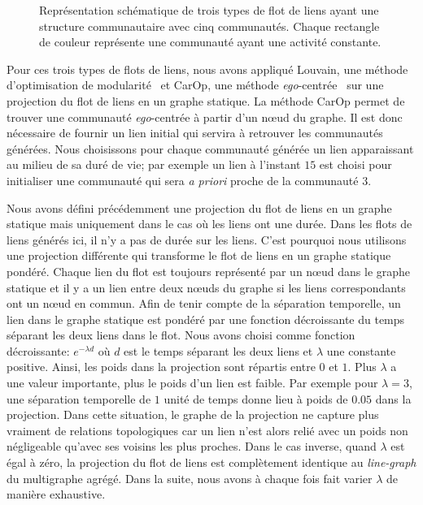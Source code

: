\begin{figure}
\begin{subfigure}{0.3\textwidth}
		\caption{}
		\label{fig:versqualite_gen_test3}
	\end{subfigure}
	\caption{Représentation schématique de trois types de flot de liens ayant une structure communautaire avec cinq communautés.
	Chaque rectangle de couleur représente une communauté ayant une activité constante.}
	\label{fig:versqualite_gen_test}
\end{figure}

\bigskip
Pour ces trois types de flots de liens, nous avons appliqué Louvain, une méthode d'optimisation de modularité~\cite{Blondel2008a} et CarOp, une méthode \emph{ego}-centrée~\cite{Danisch2012} sur une projection du flot de liens en un graphe statique.
La méthode CarOp permet de trouver une communauté \emph{ego}-centrée à partir d'un n\oe{}ud du graphe.
Il est donc nécessaire de fournir un lien initial qui servira à retrouver les communautés générées.
Nous choisissons pour chaque communauté générée un lien apparaissant au milieu de sa duré de vie; par exemple un lien à l'instant $15$ est choisi pour initialiser une communauté qui sera \emph{a priori} proche de la communauté $3$.


Nous avons défini précédemment une projection du flot de liens en un graphe statique mais uniquement dans le cas où les liens ont une durée.
Dans les flots de liens générés ici, il n'y a pas de durée sur les liens.
C'est pourquoi nous utilisons une projection différente qui transforme le flot de liens en un graphe statique pondéré.
Chaque lien du flot est toujours représenté par un n\oe{}ud dans le graphe statique et il y a un lien entre deux n\oe{}uds du graphe si les liens correspondants ont un n\oe{}ud en commun.
Afin de tenir compte de la séparation temporelle, un lien dans le graphe statique est pondéré par une fonction décroissante du temps séparant les deux liens dans le flot.
Nous avons choisi comme fonction décroissante: $e^{-\lambda d}$ où $d$ est le temps séparant les deux liens et $\lambda$ une constante positive.
Ainsi, les poids dans la projection sont répartis entre $0$ et $1$.
Plus $\lambda$ a une valeur importante, plus le poids d'un lien est faible.
Par exemple pour $\lambda=3$, une séparation temporelle de $1$ unité de temps donne lieu à poids de $0.05$ dans la projection.
Dans cette situation, le graphe de la projection ne capture plus vraiment de relations topologiques car un lien n'est alors relié avec un poids non négligeable qu'avec ses voisins les plus proches.
Dans le cas inverse, quand $\lambda$ est égal à zéro, la projection du flot de liens est complètement identique au \emph{line-graph} du multigraphe agrégé.
Dans la suite, nous avons à chaque fois fait varier $\lambda$ de manière exhaustive.

